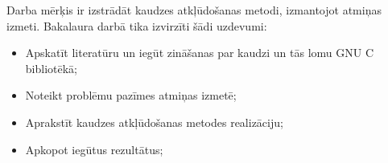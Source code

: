 ﻿
Darba mērķis ir izstrādāt kaudzes atkļūdošanas metodi, izmantojot atmiņas izmeti.
Bakalaura darbā tika izvirzīti šādi uzdevumi:
\begin{itemize}
	\item Apskatīt literatūru un iegūt zināšanas par kaudzi un tās lomu GNU C bibliotēkā;
    \item Noteikt  problēmu pazīmes atmiņas izmetē;
    \item Aprakstīt kaudzes atkļūdošanas metodes realizāciju;
    \item Apkopot iegūtus rezultātus;
\end{itemize} 